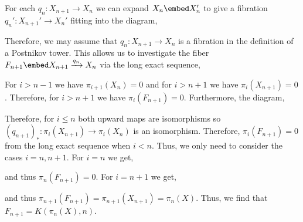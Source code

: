 \documentclass[12pt]{extarticle}
\begin{document}
\begin{rmk}
For each $q_n : X_{n+1} \to X_{n}$ we can expand $X_{n} \embed X'_{n}$ to give a fibration $q_n' : X_{n+1}' \to X_n'$ fitting into the diagram,
\begin{center}
\end{center} 
Therefore, we may assume that $q_n : X_{n+1} \to X_{n}$ is a fibration in the definition of a Postnikov tower. This allows us to investigate the fiber $F_{n+1} \embed X_{n+1} \xrightarrow{q_n} X_n$ via the long exact sequence,
\begin{center}
\end{center}
For $i > n-1$ we have $\pi_{i+1}(X_n) = 0$ and for $i > n+1$ we have $\pi_i(X_{n+1}) = 0$. Therefore, for $i > n+1$ we have $\pi_i(F_{n+1}) = 0$. Furthermore, the diagram,
\begin{center}
\end{center} 
Therefore, for $i \le n$ both upward maps are isomorphisms so $(q_{n+1})_* : \pi_i(X_{n+1}) \to \pi_i(X_n)$ is an isomorphism. Therefore, $\pi_i(F_{n+1}) = 0$ from the long exact sequence when $i < n$. Thus, we only need to consider the cases $i = n, n + 1$. For $i = n$ we get,
\begin{center}
\end{center}
and thus $\pi_n(F_{n+1}) = 0$. For $i = n + 1$ we get,
\begin{center}
\end{center}
and thus $\pi_{n+1}(F_{n+1}) = \pi_{n+1}(X_{n+1}) = \pi_n(X)$. Thus, we find that $F_{n+1} = K(\pi_n(X), n)$. 
\end{rmk}
\end{document}
